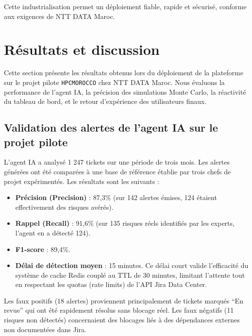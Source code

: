 Cette industrialisation permet un déploiement fiable, rapide et sécurisé, conforme aux exigences de NTT DATA Maroc.

\section{Résultats et discussion}
Cette section présente les résultats obtenus lors du déploiement de la plateforme sur le projet pilote \texttt{HPCMOROCCO} chez NTT DATA Maroc. Nous évaluons la performance de l’agent IA, la précision des simulations Monte Carlo, la réactivité du tableau de bord, et le retour d’expérience des utilisateurs finaux.

\subsection{Validation des alertes de l’agent IA sur le projet pilote}
L’agent IA a analysé 1 247 tickets sur une période de trois mois. Les alertes générées ont été comparées à une base de référence établie par trois chefs de projet expérimentés. Les résultats sont les suivants :
\begin{itemize}
    \renewcommand{\labelitemi}{—}
    \item \textbf{Précision (Precision)} : 87,3\% (sur 142 alertes émises, 124 étaient effectivement des risques avérés).
    \item \textbf{Rappel (Recall)} : 91,6\% (sur 135 risques réels identifiés par les experts, l’agent en a détecté 124).
    \item \textbf{F1-score} : 89,4\%.
    \item \textbf{Délai de détection moyen} : 15 minutes. Ce délai court valide l’efficacité du système de
cache Redis couplé au TTL de 30 minutes, limitant l’attente tout en respectant les quotas
(rate limits) de l’API Jira Data Center.
\end{itemize}
Les faux positifs (18 alertes) proviennent principalement de tickets marqués “En revue” qui ont été rapidement résolus sans blocage réel. Les faux négatifs (11 risques non détectés) concernaient des blocages liés à des dépendances externes non documentées dans Jira.

